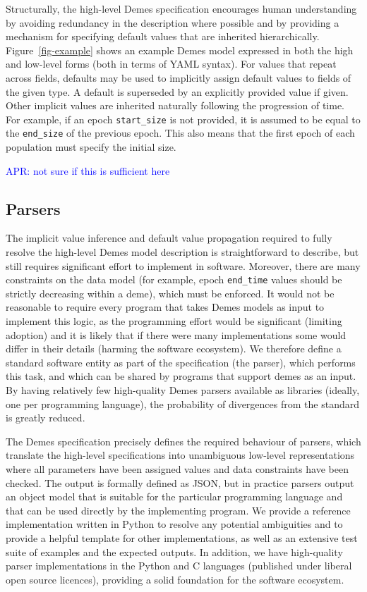 \documentclass[11pt]{article}
\newcommand{\aprcomment}[1]{{\textcolor{blue}{APR: #1}}}
\begin{document}
Structurally, the high-level Demes specification encourages human understanding
by avoiding redundancy in the description where possible and by providing a
mechanism for specifying default values that are inherited hierarchically.
Figure~\ref{fig-example} shows an example Demes model expressed in both the
high and low-level forms (both in terms of YAML syntax). For values that repeat
across fields, defaults may be used to implicitly assign default values to
fields of the given type.  A default is superseded by an explicitly provided
value if given. Other implicit values are inherited naturally following the
progression of time. For example, if an epoch \texttt{start\_size} is not
provided, it is assumed to be equal to the \texttt{end\_size} of the previous
epoch. This also means that the first epoch of each population must specify the
initial size.

\aprcomment{not sure if this is sufficient here}

\subsection*{Parsers}
The implicit value inference and default value propagation required to
fully resolve the high-level Demes model description is straightforward
to describe, but still requires significant effort to implement in
software. Moreover, there are many constraints on the data model
(for example, epoch \texttt{end\_time} values should be strictly decreasing
within a deme), which must be enforced.
It would not be reasonable to require every program that
takes Demes models as input to implement this logic, as the programming
effort would be significant (limiting adoption)
and it is likely that if there were many implementations some would differ
in their details (harming the software ecosystem).
We therefore define
a standard software entity as part of the specification (the parser),
which performs this task, and which can be shared by programs that
support demes as an input. By having relatively few high-quality Demes
parsers available as libraries (ideally, one per programming language),
the probability of divergences from the standard is greatly reduced.

The Demes specification precisely defines the required behaviour of parsers,
which translate the high-level specifications into unambiguous low-level
representations where all parameters have been assigned values and data
constraints have been checked. The output is formally defined as JSON, but in
practice parsers output an object model that is suitable for the particular
programming language and that can be used directly by the implementing program.
We provide a reference implementation written in Python to resolve any
potential ambiguities and to provide a helpful template for other
implementations, as well as an extensive test suite of examples and the
expected outputs. In addition, we have high-quality parser implementations in
the Python and C languages (published under liberal open source licences),
providing a solid foundation for the software ecosystem.
\end{document}
